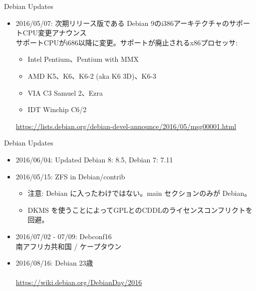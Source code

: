\begin{frame}{Debian Updates}%

\begin{itemize}[<+->]
\item 2016/05/07: 次期リリース版である Debian 9のi386アーキテクチャのサポートCPU変更アナウンス
\ \\
サポートCPUがi686以降に変更。サポートが廃止されるx86プロセッサ:
\begin{itemize}
\item Intel Pentium、Pentium with MMX
\item AMD K5、K6、K6-2 (aka K6 3D)、K6-3
\item VIA C3 Samuel 2、Ezra
\item IDT Winchip C6/2
\end{itemize}
{\tiny \url{https://lists.debian.org/debian-devel-announce/2016/05/msg00001.html}} 

\end{itemize}
\end{frame}

\begin{frame}{Debian Updates}

\begin{itemize}[<+->]
\item 2016/06/04: Updated Debian 8: 8.5, Debian 7: 7.11
\item 2016/05/15: ZFS in Debian/contrib
\ \\
	\begin{itemize}
		\item 注意: Debian に入ったわけではない。main セクションのみが Debian。
		\item DKMS を使うことによってGPLとのCDDLのライセンスコンフリクトを回避。
	\end{itemize}
\item 2016/07/02  - 07/09: Debconf16 \\
      南アフリカ共和国 / ケープタウン
\item 2016/08/16: Debian 23歳\\
\ \\

\tiny{\url{https://wiki.debian.org/DebianDay/2016}}

\end{itemize}
\end{frame}

